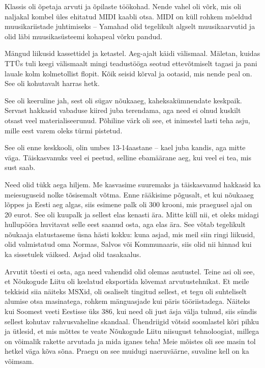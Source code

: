 
Klassis oli õpetaja arvuti ja õpilaste töökohad. Nende vahel oli võrk, mis 
oli naljakal kombel üles ehitatud MIDI kaabli otsa. MIDI on küll rohkem mõeldud muusikariistade juhtimiseks -- Yamahad olid tegelikult algselt 
muusikaarvutid ja olid läbi muusikasüsteemi kohapeal võrku pandud.

Mängud liikusid kassettidel ja ketastel. Aeg-ajalt käidi välismaal. Mäletan, kuidas TTÜs tuli keegi välismaalt 
mingi teadustööga seotud ettevõtmiselt tagasi ja pani lauale kolm kolmetollist flopit. Kõik seisid kõrval ja ootasid, mis 
nende peal on. See oli kohutavalt harras hetk.


See oli keeruline jah, sest oli sügav nõukaaeg, 
kaheksakümnendate keskpaik. Servast hakkasid vabaduse kiired juba 
terendama, aga need ei olnud kuskilt otsast veel materialiseerunud. Põhiline 
värk oli see, et inimestel lasti teha asju, mille eest varem 
oleks türmi pistetud.


See oli enne keskkooli, olin umbes 13-14aastane -- kael juba kandis, aga mitte väga. 
Täiskasvanuks veel ei peetud, selline ebamäärane aeg, kui veel ei
tea, mis sust saab.


Need olid tükk aega hiljem. Me kasvasime suuremaks ja  täiskasvanud hakkasid ka meiesuguseid nolke 
tõsisemalt võtma. Enne rääkisime põgusalt, et kui nõukaaeg lõppes 
ja Eesti aeg algas, siis esimene palk oli 300 
krooni, mis praegusel ajal on 20 eurot. See oli kuupalk ja sellest elas kenasti ära. Mitte küll nii, et oleks midagi hullupööra huvitavat selle eest 
saanud osta, aga elas ära. See võtab tegelikult nõukaaja 
elatustaseme üsna hästi kokku: kuna asjad, mis meil siin ringi liikusid, olid 
valmistatud oma Normas, Salvos või Kommunaaris, siis olid nii hinnad kui ka sissetulek väiksed. Asjad 
olid tasakaalus. 


Arvutit tõesti ei osta, aga need vahendid olid olemas asutustel. 
Teine asi oli see, et Nõukogude Liitu oli keelatud eksportida kõvemat 
arvutustehnikat. Et meile tekkisid siia näiteks MSXid, oli osaliselt 
tingitud sellest, et tegu oli suhteliselt alumise otsa masinatega, rohkem 
mänguasjade kui päris tööriistadega. Näiteks kui 
Soomest veeti Eestisse üks 386, kui need oli just äsja välja tulnud, siis sündis
sellest kohutav rahvusvaheline skandaal. Ühendriigid võtsid soomlastel kõri 
pihku ja ütlesid, et mis mõttes te veate Nõukogude Liitu niisugust 
tehnoloogiat, millega on võimalik rakette arvutada ja mida iganes teha! Meie 
mõistes oli see masin tol hetkel väga kõva sõna. Praegu on see muidugi 
naeruväärne, suvaline kell on ka võimsam.

